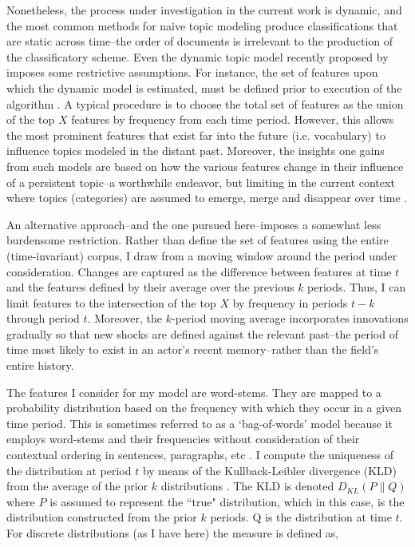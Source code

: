 Nonetheless, the process under investigation in the current work is dynamic, and the most common methods for naive topic modeling produce classifications that are static across time--the order of documents is irrelevant to the production of the classificatory scheme. Even the dynamic topic model recently proposed by \citet{blei2006} imposes some restrictive assumptions. For instance, the set of features upon which the dynamic model is estimated, must be defined prior to execution of the algorithm \citep{blei2012}. A typical procedure is to choose the total set of features as the union of the top $X$ features by frequency from each time period. However, this allows the most prominent features that exist far into the future (i.e. vocabulary) to influence topics modeled in the distant past. Moreover, the insights one gains from such models are based on how the various features change in their influence of a persistent topic--a worthwhile endeavor, but limiting in the current context where topics (categories) are assumed to emerge, merge and disappear over time \citep{goldberg2012}.

An alternative approach--and the one pursued here--imposes a somewhat less burdensome restriction. Rather than define the set of features using the entire (time-invariant) corpus, I draw from a moving window around the period under consideration. Changes are captured as the difference between features at time $t$ and the features defined by their average over the previous $k$ periods. Thus, I can limit features to the intersection of the top $X$ by frequency in periods $t-k$ through period $t$. Moreover, the $k$-period moving average incorporates innovations gradually so that new shocks are defined against the relevant past--the period of time most likely to exist in an actor's recent memory--rather than the field's entire history. 

The features I consider for my model are word-stems. They are mapped to a probability distribution based on the frequency with which they occur in a given time period. This is sometimes referred to as a `bag-of-words' model because it employs word-stems and their frequencies without consideration of their contextual ordering in sentences, paragraphs, etc \citep{jurafsky2000}. I compute the uniqueness of the distribution at period $t$ by means of the Kullback-Leibler divergence (KLD) from the average of the prior $k$ distributions \citep[see e.g.][]{klingenstein2014}. The KLD is denoted $D_{KL}(P\|Q)$ where $P$ is assumed to represent the ``true" distribution, which in this case, is the distribution constructed from the prior $k$ periods. Q is the distribution at time $t$. For discrete distributions (as I have here) the measure is defined as,

